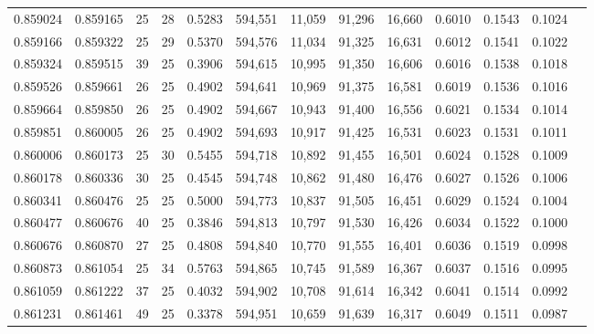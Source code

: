 \begin{tabular}{rrrrrrrrrrrrr}
0.859024 & 0.859165 &    25 &  28 &                                     0.5283 & 594,551 &  11,059 &  91,296 &  16,660 & 0.6010 & 0.1543 & 0.1024 \\
0.859166 & 0.859322 &    25 &  29 &                                     0.5370 & 594,576 &  11,034 &  91,325 &  16,631 & 0.6012 & 0.1541 & 0.1022 \\
0.859324 & 0.859515 &    39 &  25 &                                     0.3906 & 594,615 &  10,995 &  91,350 &  16,606 & 0.6016 & 0.1538 & 0.1018 \\
0.859526 & 0.859661 &    26 &  25 &                                     0.4902 & 594,641 &  10,969 &  91,375 &  16,581 & 0.6019 & 0.1536 & 0.1016 \\
0.859664 & 0.859850 &    26 &  25 &                                     0.4902 & 594,667 &  10,943 &  91,400 &  16,556 & 0.6021 & 0.1534 & 0.1014 \\
0.859851 & 0.860005 &    26 &  25 &                                     0.4902 & 594,693 &  10,917 &  91,425 &  16,531 & 0.6023 & 0.1531 & 0.1011 \\
0.860006 & 0.860173 &    25 &  30 &                                     0.5455 & 594,718 &  10,892 &  91,455 &  16,501 & 0.6024 & 0.1528 & 0.1009 \\
0.860178 & 0.860336 &    30 &  25 &                                     0.4545 & 594,748 &  10,862 &  91,480 &  16,476 & 0.6027 & 0.1526 & 0.1006 \\
0.860341 & 0.860476 &    25 &  25 &                                     0.5000 & 594,773 &  10,837 &  91,505 &  16,451 & 0.6029 & 0.1524 & 0.1004 \\
0.860477 & 0.860676 &    40 &  25 &                                     0.3846 & 594,813 &  10,797 &  91,530 &  16,426 & 0.6034 & 0.1522 & 0.1000 \\
0.860676 & 0.860870 &    27 &  25 &                                     0.4808 & 594,840 &  10,770 &  91,555 &  16,401 & 0.6036 & 0.1519 & 0.0998 \\
0.860873 & 0.861054 &    25 &  34 &                                     0.5763 & 594,865 &  10,745 &  91,589 &  16,367 & 0.6037 & 0.1516 & 0.0995 \\
0.861059 & 0.861222 &    37 &  25 &                                     0.4032 & 594,902 &  10,708 &  91,614 &  16,342 & 0.6041 & 0.1514 & 0.0992 \\
0.861231 & 0.861461 &    49 &  25 &                                     0.3378 & 594,951 &  10,659 &  91,639 &  16,317 & 0.6049 & 0.1511 & 0.0987 \\

\end{tabular}
